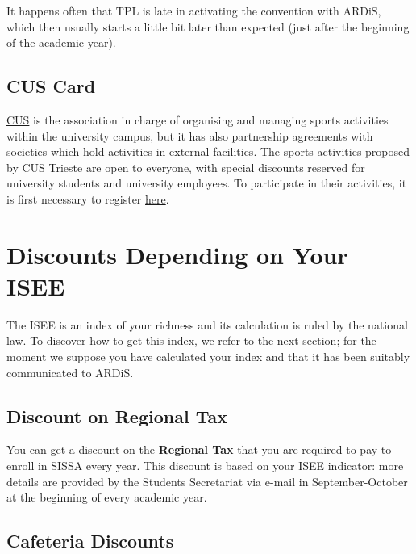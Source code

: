 \documentclass{sissavademecum}
\begin{document}
It happens often that TPL is late in activating the convention with ARDiS, which then usually starts a little bit later than expected (just after the beginning of the academic year).

\subsection{CUS Card}

\href{https://www.cus.units.it/}{CUS} is  the association in charge of organising and managing sports activities within the university campus, but it has also partnership agreements with societies which hold activities in external facilities. The sports activities proposed by CUS Trieste are open to everyone, with special discounts reserved for university students and university employees. To participate in their activities, it is first necessary to register  \href{https://www.cus.units.it/iscrizioni}{here}.


\section{Discounts Depending on Your ISEE}

The ISEE is an index of your richness and its calculation is ruled by the national law. To discover how to get this index, we refer to the next section; for the moment we suppose you have calculated your index and that it has been suitably communicated to ARDiS. 

\subsection{Discount on Regional Tax}

You can get a discount on the \textbf{Regional Tax} that you are required to pay to enroll in SISSA every year. This discount is based on your ISEE indicator: more details are provided by the Students Secretariat via e-mail in September-October at the beginning of every academic year.

\subsection{Cafeteria Discounts}
\end{document}
